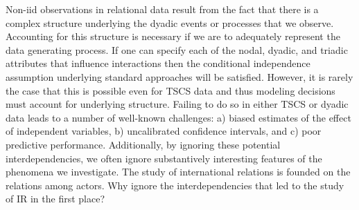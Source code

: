 
Non-iid observations in relational data result from the fact that there is a complex structure underlying the dyadic events or processes that we observe. Accounting for this structure is necessary if we are to adequately represent the data generating process. If one can specify each of the nodal, dyadic, and triadic attributes that influence interactions then the conditional independence assumption underlying standard approaches will be satisfied. However, it is rarely the case that this is possible even for TSCS data and thus modeling decisions must account for underlying structure. Failing to do so in either TSCS or dyadic data leads to a number of well-known challenges: a) biased estimates of the effect of independent variables, b) uncalibrated confidence intervals, and c) poor predictive performance. Additionally, by ignoring these potential interdependencies, we often ignore substantively interesting features of the phenomena we investigate. The study of international relations is founded on the relations among actors. Why ignore the interdependencies that led to the study of IR in the first place?
